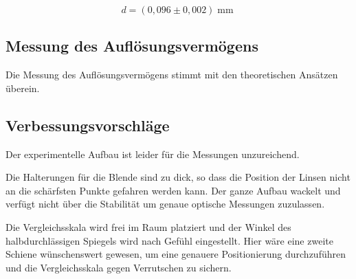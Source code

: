 \documentclass[a4paper,german,12pt,smallheadings]{scrartcl}
\begin{document}
\begin{equation}
  d = (0{,}096\pm0{,}002) \operatorname{mm}
\end{equation}

\subsection{Messung des Auflösungsvermögens}

Die Messung des Auflösungsvermögens stimmt mit den theoretischen Ansätzen
überein.

\subsection{Verbessungsvorschläge}

Der experimentelle Aufbau ist leider für die Messungen unzureichend.

Die Halterungen für die Blende sind zu dick, so dass die Position der Linsen
nicht an die schärfsten Punkte gefahren werden kann. Der ganze Aufbau wackelt und
verfügt nicht über die Stabilität um genaue optische Messungen zuzulassen.

Die Vergleichsskala wird frei im Raum platziert und der Winkel des
halbdurchlässigen Spiegels wird nach Gefühl eingestellt. Hier wäre eine zweite
Schiene wünschenswert gewesen, um eine genauere Positionierung durchzuführen und
die Vergleichsskala gegen Verrutschen zu sichern.
\end{document}
